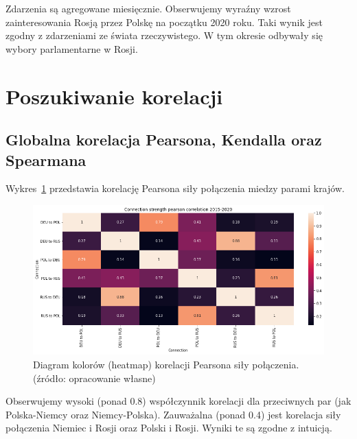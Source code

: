 \documentclass[11pt]{report}
\begin{document}
    Zdarzenia są agregowane miesięcznie.
    Obserwujemy wyraźny wzrost zainteresowania Rosją przez Polskę na początku 2020 roku.
    Taki wynik jest zgodny z zdarzeniami ze świata rzeczywistego.
    W tym okresie odbywały się wybory parlamentarne w Rosji.


    \section{Poszukiwanie korelacji}\label{sec:poszukiwanie-korelacji}

    \subsection{Globalna korelacja Pearsona, Kendalla oraz Spearmana}
    Wykres~\ref{fig:Connection strength pearson correlation 2015-2020} przedstawia korelację Pearsona siły połączenia miedzy parami krajów.

    \begin{figure}[!ht]
        \centering
        \includegraphics[width=\linewidth]{../spade_proto/figures/correlation/Connection strength pearson correlation 2015-2020.png}
        \caption{Diagram kolorów (heatmap) korelacji Pearsona siły połączenia. (źródło: opracowanie własne)}
        \label{fig:Connection strength pearson correlation 2015-2020}
    \end{figure}

    Obserwujemy wysoki (ponad 0.8) współczynnik korelacji dla przeciwnych par (jak Polska-Niemcy oraz Niemcy-Polska).
    Zauważalna (ponad 0.4) jest korelacja siły połączenia Niemiec i Rosji oraz Polski i Rosji.
    Wyniki te są zgodne z intuicją.
\end{document}
